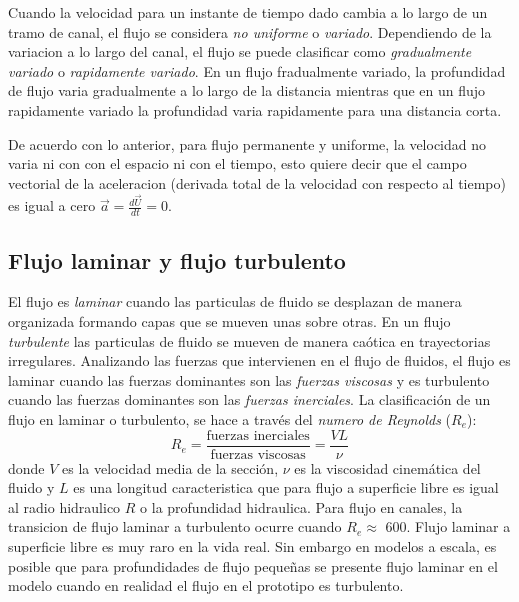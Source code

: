 \documentclass[11pt, oneside]{article}
\begin{document}
Cuando la velocidad para un instante de tiempo dado cambia a lo largo de un tramo de canal, el flujo se considera \emph{no uniforme} o \emph{variado}. Dependiendo de la variacion a lo largo del canal, el flujo se puede clasificar como \emph{gradualmente variado} o \emph{rapidamente variado}. En un flujo fradualmente variado, la profundidad de flujo varia gradualmente a lo largo de la distancia mientras que en un flujo rapidamente variado la profundidad varia rapidamente para una distancia corta.

De acuerdo con lo anterior, para flujo permanente y uniforme, la velocidad no varia ni con con el espacio ni con el tiempo, esto quiere decir que el campo vectorial de la aceleracion (derivada total de la velocidad con respecto al tiempo) es igual a cero $\vec{a}=\frac{d \vec{U}}{d t} = 0$.

\subsection{Flujo laminar y flujo turbulento}
El flujo es \emph{laminar} cuando las particulas de fluido se desplazan de manera organizada formando capas que se mueven unas sobre otras. En un flujo \emph{turbulente} las particulas de fluido se mueven de manera ca\'otica en trayectorias irregulares. Analizando las fuerzas que intervienen en el flujo de fluidos, el flujo es laminar cuando las fuerzas dominantes son las \emph{fuerzas viscosas} y es turbulento cuando las fuerzas dominantes son las \emph{fuerzas inerciales}. La clasificaci\'on de un flujo en laminar o turbulento, se hace a trav\'es del \emph{numero de Reynolds} ($R_e$):
\begin{equation}
R_e = \frac{\text{fuerzas inerciales}}{\text{fuerzas viscosas}} = \frac{V L}{\nu}
\label{Re}
\end{equation}
donde $V$ es la velocidad media de la secci\'on, $\nu$ es la viscosidad cinem\'atica del fluido y $L$ es una longitud caracteristica que para flujo a superficie libre es igual al radio hidraulico $R$ o la profundidad hidraulica. Para flujo en canales, la transicion de flujo laminar a turbulento ocurre cuando $R_e \approx $ 600. Flujo laminar a superficie libre es muy raro en la vida real. Sin embargo en modelos a escala, es posible que para profundidades de flujo pequeñas  se presente flujo laminar en el modelo cuando en realidad el flujo en el prototipo es turbulento. 
\end{document}

